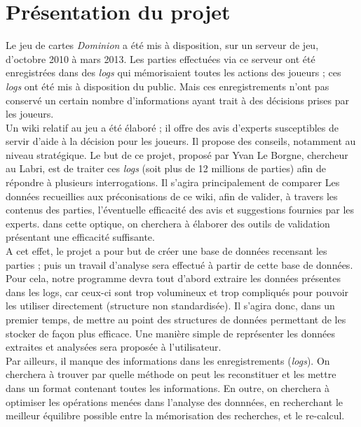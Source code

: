 \chapter{Présentation du projet}

Le jeu de cartes \textit{Dominion} a été mis à disposition, sur un serveur de jeu, d'octobre 2010 à mars 2013. Les parties effectuées via ce serveur ont été enregistrées dans des \textit{logs} qui mémorisaient toutes les actions des joueurs ; ces \textit{logs} ont été mis à disposition du public. Mais ces enregistrements n'ont pas conservé un certain nombre d'informations ayant trait à des décisions prises par les joueurs.\\

Un wiki relatif au jeu a été élaboré ; il offre des avis d'experts susceptibles de servir d'aide à la décision pour les joueurs. Il propose des conseils, notamment au niveau stratégique. Le but de ce projet, proposé par Yvan Le Borgne, chercheur au Labri, est de traiter ces \textit{logs} (soit plus de 12 millions de parties) afin de répondre à plusieurs interrogations. Il s'agira principalement de comparer Les données recueillies aux préconisations de ce wiki, afin de valider, à travers les contenus des parties, l'éventuelle efficacité des avis et suggestions fournies par les experts. dans cette optique, on cherchera à élaborer des outils de validation présentant une efficacité suffisante.\\
 
A cet effet, le projet a pour but de créer une base de données recensant les parties ; puis un travail d'analyse sera effectué à partir de cette base de données.
Pour cela, notre programme devra tout d'abord extraire les données présentes dans les logs, car ceux-ci sont trop volumineux et trop compliqués pour pouvoir les utiliser directement (structure non standardisée). Il s'agira donc, dans un premier temps, de mettre au point des structures de données permettant de les stocker de façon plus efficace. Une manière simple de représenter les données extraites et analysées sera proposée à l'utilisateur.\\

Par ailleurs, il manque des informations dans les enregistrements (\textit{logs}). On cherchera à trouver par quelle méthode on peut les reconstituer et les mettre dans un format contenant toutes les informations.
En outre, on cherchera à optimiser les opérations menées dans l'analyse des donnnées, en recherchant le meilleur équilibre possible entre la mémorisation des recherches, et le re-calcul.\\

